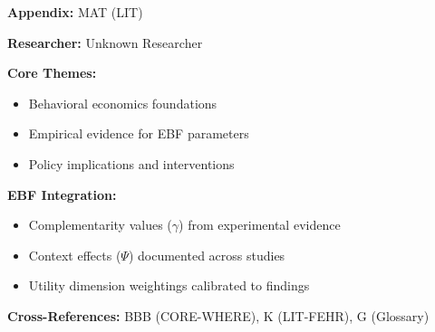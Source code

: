 \begin{tcolorbox}[colback=blue!5!white, colframe=blue!75!black,
    title=Quick Reference: Unknown Researcher Research]

\textbf{Appendix:} MAT (LIT)

\textbf{Researcher:} Unknown Researcher

\textbf{Core Themes:}
\begin{itemize}[nosep]
\item Behavioral economics foundations
\item Empirical evidence for EBF parameters
\item Policy implications and interventions
\end{itemize}

\textbf{EBF Integration:}
\begin{itemize}[nosep]
\item Complementarity values ($\gamma$) from experimental evidence
\item Context effects ($\Psi$) documented across studies
\item Utility dimension weightings calibrated to findings
\end{itemize}

\textbf{Cross-References:} BBB (CORE-WHERE), K (LIT-FEHR), G (Glossary)
\end{tcolorbox}


